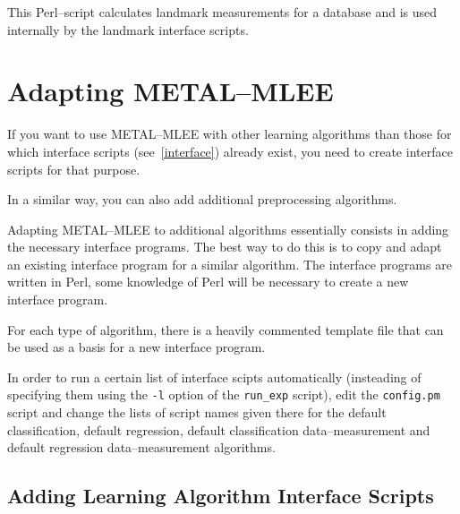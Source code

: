 \documentclass[a4paper,10pt,twoside]{article}
\newcommand{\eenameshort}{\textsf{METAL--MLEE}}
\begin{document}
This Perl--script calculates landmark measurements for a database and is 
used internally by the landmark interface scripts.

\section{Adapting \eenameshort{}}
\label{adapt}
If you want to use \eenameshort{} with other learning algorithms
than those for which interface scripts (see~\ref{interface}) already 
exist, you need to create interface scripts for that purpose.

In a similar way, you can also add additional preprocessing algorithms. 

Adapting \eenameshort{} to additional algorithms essentially
consists in adding the necessary interface programs. The
best way to do this is to copy and adapt an existing interface
program for a similar algorithm. The interface programs
are written in Perl, some knowledge of Perl
will be necessary to create a new interface program.

For each type of algorithm, there is a heavily
commented template file that can be used as a basis for
a new interface program.

In order to run a certain list of interface scipts automatically
(insteading of specifying them using the \texttt{-l} option
of the \texttt{run\_exp} script), edit the \texttt{config.pm}
script and change the lists of script names given there for
the default classification, default regression, default 
classification data--measurement and default regression
data--measurement algorithms.

\subsection{Adding Learning Algorithm Interface Scripts}
\end{document}
